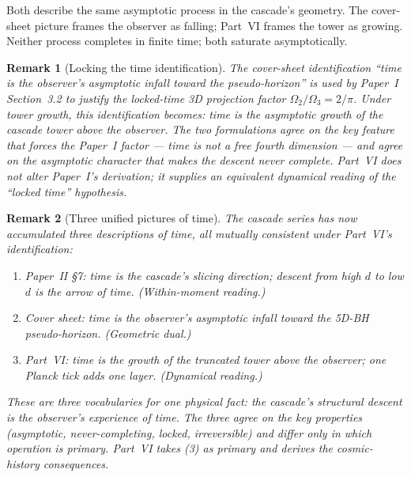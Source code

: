 \documentclass[12pt,a4paper]{article}
\newtheorem*{remark}{Remark}
\begin{document}
Both describe the same asymptotic process in the cascade's geometry. The
cover-sheet picture frames the observer as falling; Part~VI frames the tower
as growing. Neither process completes in finite time; both saturate
asymptotically.

\begin{remark}[Locking the time identification]
The cover-sheet identification ``time is the observer's asymptotic infall
toward the pseudo-horizon'' is used by Paper~I~\cite{part1} Section~3.2 to
justify the locked-time 3D projection factor $\Omega_2/\Omega_3 = 2/\pi$.
Under tower growth, this identification becomes: time is the asymptotic
growth of the cascade tower above the observer. The two formulations agree on
the key feature that forces the Paper~I factor --- time is not a free fourth
dimension --- and agree on the asymptotic character that makes the descent
never complete. Part~VI does not alter Paper~I's derivation; it supplies an
equivalent dynamical reading of the ``locked time'' hypothesis.
\end{remark}

\begin{remark}[Three unified pictures of time]
The cascade series has now accumulated three descriptions of time, all
mutually consistent under Part~VI's identification:
\begin{enumerate}[nosep]
\item \emph{Paper~II \S7}: time is the cascade's slicing direction; descent
from high $d$ to low $d$ is the arrow of time. (Within-moment reading.)
\item \emph{Cover sheet}: time is the observer's asymptotic infall toward the
5D-BH pseudo-horizon. (Geometric dual.)
\item \emph{Part~VI}: time is the growth of the truncated tower above the
observer; one Planck tick adds one layer. (Dynamical reading.)
\end{enumerate}
These are three vocabularies for one physical fact: the cascade's structural
descent is the observer's experience of time. The three agree on the key
properties (asymptotic, never-completing, locked, irreversible) and differ
only in which operation is primary. Part~VI takes (3) as primary and derives
the cosmic-history consequences.
\end{remark}
\end{document}
